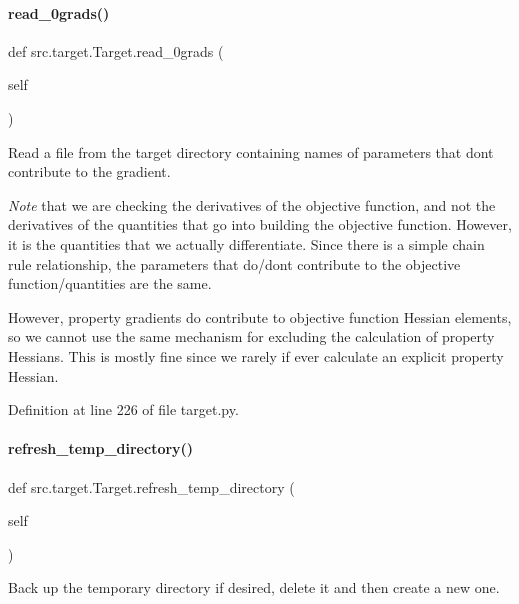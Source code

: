 \paragraph{\texorpdfstring{read\+\_\+0grads()}{read\_0grads()}}
{\footnotesize\ttfamily def src.\+target.\+Target.\+read\+\_\+0grads (\begin{DoxyParamCaption}\item[{}]{self }\end{DoxyParamCaption})}



Read a file from the target directory containing names of parameters that don\textquotesingle{}t contribute to the gradient. 

{\itshape Note} that we are checking the derivatives of the objective function, and not the derivatives of the quantities that go into building the objective function. However, it is the quantities that we actually differentiate. Since there is a simple chain rule relationship, the parameters that do/don\textquotesingle{}t contribute to the objective function/quantities are the same.

However, property gradients do contribute to objective function Hessian elements, so we cannot use the same mechanism for excluding the calculation of property Hessians. This is mostly fine since we rarely if ever calculate an explicit property Hessian. 

Definition at line 226 of file target.\+py.

\mbox{\label{classsrc_1_1target_1_1Target_ad8126429a9b72dff627da96934cd7f5c}} 
\paragraph{\texorpdfstring{refresh\+\_\+temp\+\_\+directory()}{refresh\_temp\_directory()}}
{\footnotesize\ttfamily def src.\+target.\+Target.\+refresh\+\_\+temp\+\_\+directory (\begin{DoxyParamCaption}\item[{}]{self }\end{DoxyParamCaption})}



Back up the temporary directory if desired, delete it and then create a new one. 



